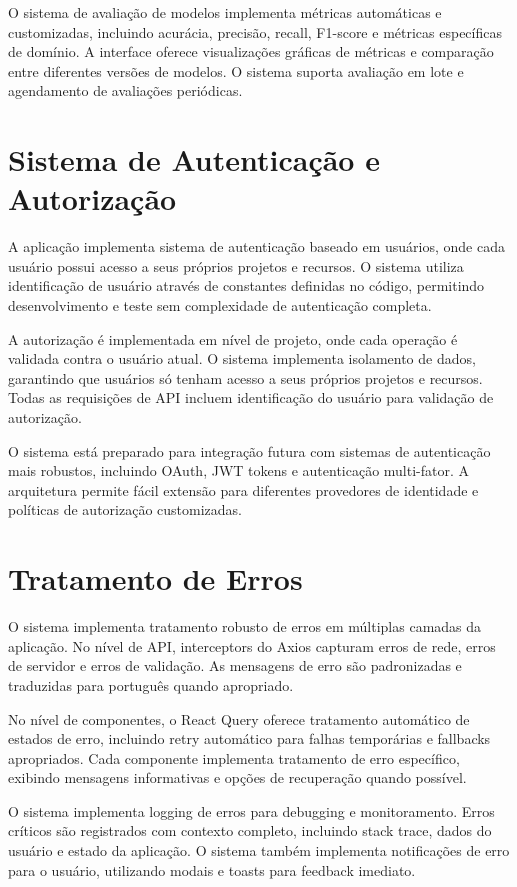 \documentclass[12pt,a4paper]{article}
\begin{document}
O sistema de avaliação de modelos implementa métricas automáticas e customizadas, incluindo acurácia, precisão, recall, F1-score e métricas específicas de domínio. A interface oferece visualizações gráficas de métricas e comparação entre diferentes versões de modelos. O sistema suporta avaliação em lote e agendamento de avaliações periódicas.

\section{Sistema de Autenticação e Autorização}

A aplicação implementa sistema de autenticação baseado em usuários, onde cada usuário possui acesso a seus próprios projetos e recursos. O sistema utiliza identificação de usuário através de constantes definidas no código, permitindo desenvolvimento e teste sem complexidade de autenticação completa.

A autorização é implementada em nível de projeto, onde cada operação é validada contra o usuário atual. O sistema implementa isolamento de dados, garantindo que usuários só tenham acesso a seus próprios projetos e recursos. Todas as requisições de API incluem identificação do usuário para validação de autorização.

O sistema está preparado para integração futura com sistemas de autenticação mais robustos, incluindo OAuth, JWT tokens e autenticação multi-fator. A arquitetura permite fácil extensão para diferentes provedores de identidade e políticas de autorização customizadas.

\section{Tratamento de Erros}

O sistema implementa tratamento robusto de erros em múltiplas camadas da aplicação. No nível de API, interceptors do Axios capturam erros de rede, erros de servidor e erros de validação. As mensagens de erro são padronizadas e traduzidas para português quando apropriado.

No nível de componentes, o React Query oferece tratamento automático de estados de erro, incluindo retry automático para falhas temporárias e fallbacks apropriados. Cada componente implementa tratamento de erro específico, exibindo mensagens informativas e opções de recuperação quando possível.

O sistema implementa logging de erros para debugging e monitoramento. Erros críticos são registrados com contexto completo, incluindo stack trace, dados do usuário e estado da aplicação. O sistema também implementa notificações de erro para o usuário, utilizando modais e toasts para feedback imediato.
\end{document}
